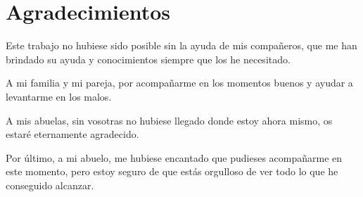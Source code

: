 \chapter*{Agradecimientos}

Este trabajo no hubiese sido posible sin la ayuda de mis compañeros, que me han brindado su ayuda y conocimientos siempre que los he necesitado.

A mi familia y mi pareja, por acompañarme en los momentos buenos y ayudar a levantarme en los malos.

A mis abuelas, sin vosotras no hubiese llegado donde estoy ahora mismo, os estaré eternamente agradecido.

Por último, a mi abuelo, me hubiese encantado que pudieses acompañarme en este momento, pero estoy seguro de que estás orgulloso de ver todo lo que he conseguido alcanzar.